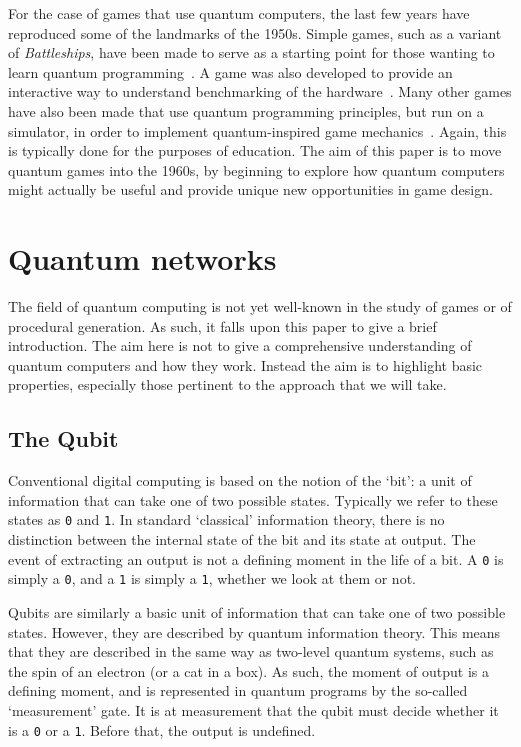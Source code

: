 \documentclass[conference]{IEEEtran}
\begin{document}
For the case of games that use quantum computers, the last few years have reproduced some of the landmarks of the 1950s. Simple games, such as a variant of \textit{Battleships}, have been made to serve as a starting point for those wanting to learn quantum programming~\cite{wootton:battleships}. A game was also developed to provide an interactive way to understand benchmarking of the hardware~\cite{wootton:awesomeness}. Many other games have also been made that use quantum programming principles, but run on a simulator, in order to implement quantum-inspired game mechanics~\cite{wootton:history}. Again, this is typically done for the purposes of education. The aim of this paper is to move quantum games into the 1960s, by beginning to explore how quantum computers might actually be useful and provide unique new opportunities in game design.

\section{Quantum networks}

The field of quantum computing is not yet well-known in the study of games or of procedural generation. As such, it falls upon this paper to give a brief introduction. The aim here is not to give a comprehensive understanding of quantum computers and how they work. Instead the aim is to highlight basic properties, especially those pertinent to the approach that we will take.


\subsection{The Qubit}

Conventional digital computing is based on the notion of the `bit': a unit of information that can take one of two possible states. Typically we refer to these states as \texttt{0} and \texttt{1}. In standard `classical' information theory, there is no distinction between the internal state of the bit and its state at output. The event of extracting an output is not a defining moment in the life of a bit. A \texttt{0} is simply a \texttt{0}, and a \texttt{1} is simply a \texttt{1}, whether we look at them or not.

Qubits are similarly a basic unit of information that can take one of two possible states. However, they are described by quantum information theory. This means that they are described in the same way as two-level quantum systems, such as the spin of an electron (or a cat in a box). As such, the moment of output is a defining moment, and is represented in quantum programs by the so-called `measurement' gate. It is at measurement that the qubit must decide whether it is a \texttt{0} or a \texttt{1}. Before that, the output is undefined.
\end{document}
